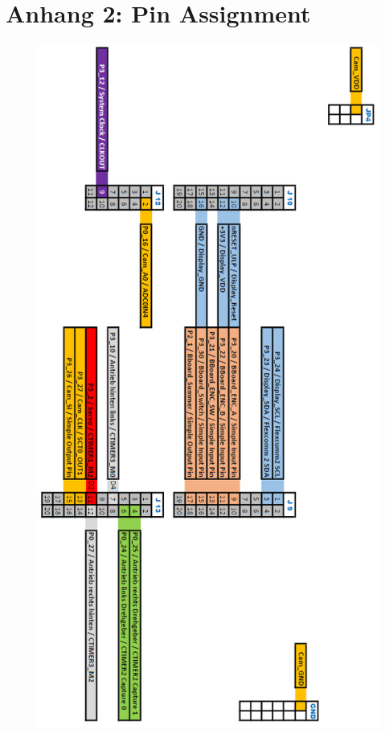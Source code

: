 \section*{Anhang 2: Pin Assignment} \label{SecAtt2}
\begin{figure}[H] %
\includegraphics[width=.75\textwidth]{attachement/PinAssignment} 
\centering
\label{Att:PinAssignment}
\end{figure}

\newpage